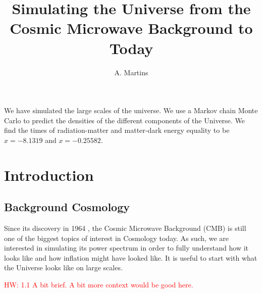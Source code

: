 \documentclass{aa}
\newcommand{\hw}[1]{\textcolor{red}{HW: #1}}
\begin{document}
 


   \title{Simulating the Universe from the Cosmic Microwave Background to Today}

   \subtitle{}

   \author{A. Martins
          }


   \date{}

 
  \abstract
   {}
   {We have simulated the large scales of the universe.}
   {We use a Markov chain Monte Carlo to predict the densities of the different components of the Universe.}
   {We find the times of radiation-matter and matter-dark energy equality to be $x=-8.1319$ and $x=-0.25582$.}
   {}


   \maketitle
%

\section{Introduction}

\subsection{Background Cosmology}
Since its discovery in 1964 \citep{1965ApJ...142..419P, 1965ApJ...142..414D}, the Cosmic Microwave Background (CMB) is still one of the biggest topics of interest in Cosmology today.
As such, we are interested in simulating its power spectrum in order to fully understand how it looks like and how inflation might have looked like. It is useful to start with what the Universe looks like on large scales.

\hw{1.1 A bit brief. A bit more context would be good here.}
\end{document}
